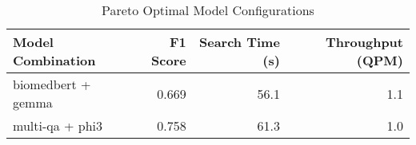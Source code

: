 \begin{table}
\caption{Pareto Optimal Model Configurations}
\label{tab:pareto_optimal}
\begin{tabular}{lrrr}
\toprule
Model Combination & F1 Score & Search Time (s) & Throughput (QPM) \\
\midrule
biomedbert + gemma & 0.669 & 56.1 & 1.1 \\
multi-qa + phi3 & 0.758 & 61.3 & 1.0 \\
\bottomrule
\end{tabular}
\end{table}